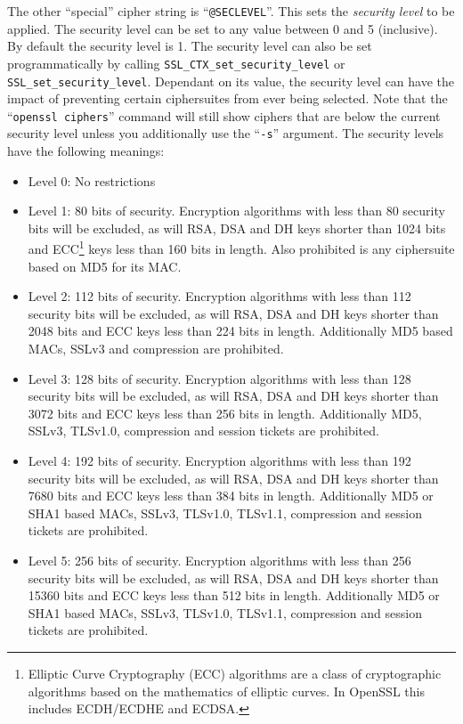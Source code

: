 The other ``special'' cipher string is ``\verb!@SECLEVEL!''. This sets the 
\emph{security level} to be applied. The security level can be set to any value 
between 0 and 5 (inclusive). By default the security level is 1. The security 
level can also be set programmatically by calling 
\verb!SSL_CTX_set_security_level! or \verb!SSL_set_security_level!. Dependant 
on its value, the security level can have the impact of preventing certain
ciphersuites from ever being selected. Note that the ``\verb!openssl ciphers!''
command will still show ciphers that are below the current security level 
unless you additionally use the ``\verb!-s!'' argument. The security levels 
have the following meanings:
\begin{itemize}
\item Level 0: No restrictions
\item Level 1: 80 bits of security. Encryption algorithms with less than 80 
security bits will be excluded, as will RSA, DSA and DH keys shorter than 1024 
bits and ECC\footnote{Elliptic Curve Cryptography (ECC) algorithms are a class 
of cryptographic algorithms based on the mathematics of elliptic curves. In 
OpenSSL this includes ECDH/ECDHE and ECDSA.} keys less than 160 bits in length. 
Also prohibited is any ciphersuite based on MD5 for its MAC.
\item Level 2: 112 bits of security.  Encryption algorithms with less than 112 
security bits will be excluded, as will RSA, DSA and DH keys shorter than 2048 
bits and ECC keys less than 224 bits in length. Additionally MD5 based MACs,
SSLv3 and compression are prohibited.
\item Level 3: 128 bits of security.  Encryption algorithms with less than 128 
security bits will be excluded, as will RSA, DSA and DH keys shorter than 3072 
bits and ECC keys less than 256 bits in length. Additionally MD5, SSLv3,
TLSv1.0, compression and session tickets are prohibited.
\item Level 4: 192 bits of security. Encryption algorithms with less than 192 
security bits will be excluded, as will RSA, DSA and DH keys shorter than 7680 
bits and ECC keys less than 384 bits in length. Additionally MD5 or SHA1 based 
MACs, SSLv3, TLSv1.0, TLSv1.1, compression and session tickets are prohibited.
\item Level 5: 256 bits of security. Encryption algorithms with less than 256 
security bits will be excluded, as will RSA, DSA and DH keys shorter than 15360 
bits and ECC keys less than 512 bits in length. Additionally MD5 or SHA1 based 
MACs, SSLv3, TLSv1.0, TLSv1.1, compression and session tickets are prohibited.
\end{itemize}

